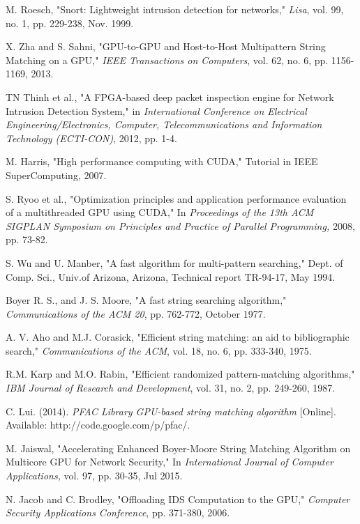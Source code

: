 \begin{thebibliography}{10}
 M. Roesch, "Snort: Lightweight intrusion detection for networks," \textit{Lisa}, vol. 99, no. 1, pp. 229-238, Nov. 1999. 

 X. Zha and S. Sahni, "GPU-to-GPU and Host-to-Host Multipattern String Matching on a GPU," \textit{IEEE Transactions on Computers}, vol. 62, no. 6, pp. 1156-1169, 2013.

 TN Thinh et al., "A FPGA-based deep packet inspection engine for Network Intrusion Detection System," in \textit{International Conference on Electrical Engineering/Electronics, Computer, Telecommunications and Information Technology (ECTI-CON)}, 2012, pp. 1-4.

M. Harris, "High performance computing with CUDA," Tutorial in IEEE SuperComputing, 2007. 

 S. Ryoo et al., "Optimization principles and application performance evaluation of a multithreaded GPU using CUDA," In \textit{Proceedings of the 13th ACM SIGPLAN Symposium on Principles and Practice of Parallel Programming,} 2008, pp. 73-82.

 S. Wu and U. Manber, "A fast algorithm for multi-pattern searching," Dept. of Comp. Sci., Univ.of Arizona, Arizona, Technical report TR-94-17, May 1994.

Boyer R. S., and J. S. Moore, "A fast string searching algorithm," \textit{Communications of the ACM 20}, pp. 762-772, October 1977.

 A. V. Aho and M.J. Corasick, "Efficient string matching: an aid to bibliographic search," \textit{Communications of the ACM}, vol. 18, no. 6, pp. 333-340, 1975.

 R.M. Karp and M.O. Rabin, "Efficient randomized pattern-matching algorithms," \textit{IBM Journal of Research and Development}, vol. 31, no. 2, pp. 249-260, 1987.

 C. Lui. (2014). \textit{PFAC Library GPU-based string
	matching algorithm} [Online]. Available: http://code.google.com/p/pfac/.

 M. Jaiswal, "Accelerating Enhanced Boyer-Moore String Matching Algorithm on Multicore GPU for Network Security," In \textit{International Journal
of Computer Applications,} vol. 97, pp. 30-35, Jul 2015.

 N. Jacob and C. Brodley, "Offloading IDS Computation to the
GPU," \textit{Computer Security Applications Conference}, pp. 371-380, 2006.


\end{thebibliography}
